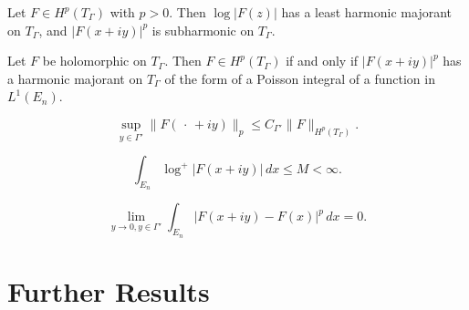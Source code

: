 \begin{theorem}\label{thm:c3-5-5}
Let $F \in H^p(T_\Gamma)$ with $p > 0$. Then $\log |F(z)|$ has a least harmonic majorant on $T_\Gamma$, and $|F(x + iy)|^p$ is subharmonic on $T_\Gamma$.
\end{theorem}

\begin{theorem}\label{thm:c3-5-6}
Let $F$ be holomorphic on $T_\Gamma$. Then $F \in H^p(T_\Gamma)$ if and only if $|F(x + iy)|^p$ has a harmonic majorant on $T_\Gamma$ of the form of a Poisson integral of a function in $L^1(E_n)$.
\end{theorem}

\begin{equation}\label{eq:c3-5-7}
\sup_{y \in \Gamma'} \|F(\,\cdot\, + iy)\|_p \leq C_{\Gamma'} \|F\|_{H^p(T_\Gamma)}.
\end{equation}

\begin{equation}\label{eq:c3-5-8}
\int_{E_n} \log^+ |F(x + iy)|\,dx \leq M < \infty.
\end{equation}

\begin{equation}\label{eq:c3-5-9}
\lim_{y \to 0, y \in \Gamma'} \int_{E_n} |F(x + iy) - F(x)|^p\,dx = 0.
\end{equation}

\section{Further Results}

